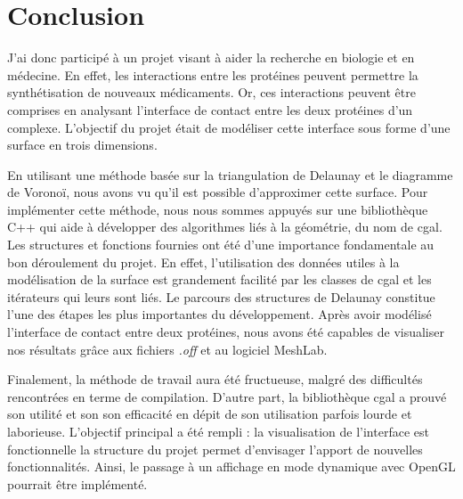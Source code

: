 \chapter*{Conclusion}

J'ai donc participé à un projet visant à aider la recherche en biologie et en médecine.
En effet, les interactions entre les protéines peuvent permettre la synthétisation de
nouveaux médicaments. Or, ces interactions peuvent être comprises en analysant l'interface
de contact entre les deux protéines d'un complexe. L'objectif du projet était de modéliser
cette interface sous forme d'une surface en trois dimensions.

En utilisant une méthode basée sur la triangulation de Delaunay et le diagramme de
Voronoï, nous avons vu qu'il est possible d'approximer cette surface.
Pour implémenter cette méthode, nous nous sommes appuyés sur une bibliothèque C++ qui
aide à développer des algorithmes liés à la géométrie, du nom de \gls{cgal}. Les structures et fonctions fournies
ont été d'une importance fondamentale au bon déroulement du projet. En effet, l'utilisation
des données utiles à la modélisation de la surface est grandement facilité par les classes de \gls{cgal}
et les itérateurs qui leurs sont liés. Le parcours des structures de Delaunay constitue
l'une des étapes les plus importantes du développement.
Après avoir modélisé l'interface de contact entre deux protéines, nous avons été capables
de visualiser nos résultats grâce aux fichiers \textit{.off} et au logiciel MeshLab.

Finalement, la méthode de travail aura été fructueuse, malgré des difficultés rencontrées
en terme de compilation. D'autre part, la bibliothèque \gls{cgal} a prouvé son utilité
et son son efficacité en dépit de son utilisation parfois lourde et laborieuse.
L'objectif principal a été rempli : la visualisation de l'interface est fonctionnelle
la structure du projet permet d'envisager l'apport de nouvelles fonctionnalités.
Ainsi, le passage à un affichage en mode dynamique avec OpenGL pourrait être
implémenté.
